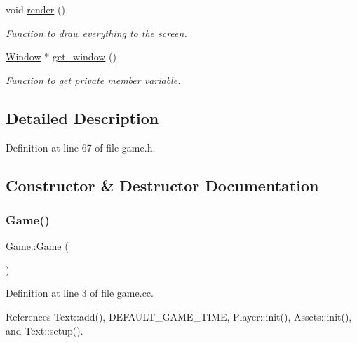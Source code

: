 \begin{DoxyCompactItemize}
void \hyperlink{class_game_a15ddd769261d923827a3cdf41499c843}{render} ()
\begin{DoxyCompactList}\small\item\em Function to draw everything to the screen. \end{DoxyCompactList}\item 
\hyperlink{class_window}{Window} $\ast$ \hyperlink{class_game_ada27344ddafc8489f4d6ab5ec6cd9a8e}{get\+\_\+window} ()
\begin{DoxyCompactList}\small\item\em Function to get private member variable. \end{DoxyCompactList}\end{DoxyCompactItemize}


\subsection{Detailed Description}


Definition at line 67 of file game.\+h.



\subsection{Constructor \& Destructor Documentation}
\mbox{\label{class_game_ad59df6562a58a614fda24622d3715b65}} 
\subsubsection{\texorpdfstring{Game()}{Game()}}
{\footnotesize\ttfamily Game\+::\+Game (\begin{DoxyParamCaption}{ }\end{DoxyParamCaption})}



Definition at line 3 of file game.\+cc.



References Text\+::add(), D\+E\+F\+A\+U\+L\+T\+\_\+\+G\+A\+M\+E\+\_\+\+T\+I\+ME, Player\+::init(), Assets\+::init(), and Text\+::setup().


